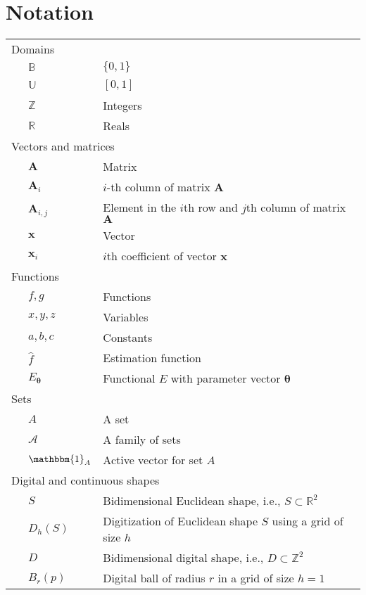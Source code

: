 \chapter*{Notation}
\label{chapternotation}

\begin{longtable}{p{0.5cm}ll}
\multicolumn{3}{l}{Domains}\\
& $\mathbb{B}$ & $\{0,1\}$\\\
& $\mathbb{U}$ & $[0,1]$\\
& $\mathbb{Z}$ & Integers\\
& $\mathbb{R}$ & Reals\\[1em]

\multicolumn{3}{l}{Vectors and matrices}\\
& $\mathbf{A}$ & Matrix\\
& $\mathbf{A}_i$ & $i$-th column of matrix $\mathbf{A}$\\
& $\mathbf{A}_{i,j}$ & Element in the $i$th row and $j$th column of matrix $\mathbf{A}$\\
& $\mathbf{x}$ & Vector\\
& $\mathbf{x}_i$ & $i$th coefficient of vector $\mathbf{x}$\\[1em]

\multicolumn{3}{l}{Functions}\\
& $f,g$ & Functions\\
& $x,y,z$ & Variables \\
& $a,b,c$ & Constants \\
& $\hat{f}$ & Estimation function\\
& $E_{\boldsymbol{\theta}}$ & Functional $E$  with parameter vector $\boldsymbol{\theta}$ \\[1em]

\multicolumn{3}{l}{Sets}\\
& $A$ & A set\\
& $\mathcal{A}$ & A family of sets\\
& $\mathbbm{1}_A$ & Active vector for set $A$\\[1em]


\multicolumn{3}{l}{Digital and continuous shapes}\\
& $S$ & Bidimensional Euclidean shape, i.e.,  $S \subset \mathbb{R}^2$\\
& $D_h(S)$ & Digitization of Euclidean shape $S$  using a grid of size $h$\\
& $D$ & Bidimensional digital shape, i.e., $D \subset \mathbb{Z}^2$\\
& $B_r(p)$ & Digital ball of radius $r$  in a grid of size $h=1$ \\[1em]


\end{longtable}
